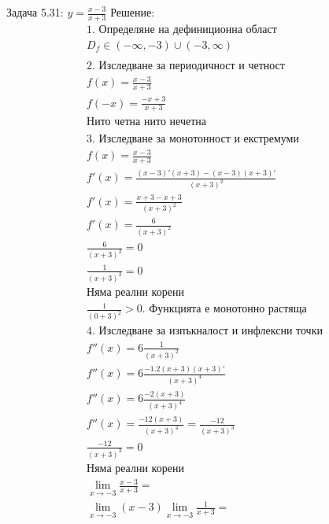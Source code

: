 \documentclass[a4paper, 20pt, fleqn, border=2pt]{article}
\begin{document}
\begin{enumerate}

Задача 5.31: $y = \frac{x - 3}{x + 3}$
Решение:
\begin{equation}
\begin{split}
    \text{1. Определяне на дефиниционна област} \\
    D_f \in (-\infty, -3) \cup (-3, \infty) \\
    \\
    \text{2. Изследване за периодичност и четност} \\
    f(x) = \frac{x - 3}{x + 3} \\
    f(-x) = \frac{-x + 3}{x + 3} \\
    \text{Нито четна нито нечетна} \\
    \\
    \text{3. Изследване за монотонност и екстремуми} \\
    f(x) = \frac{x - 3}{x + 3} \\
    f'(x) = \frac{(x - 3)'(x + 3) - (x - 3)(x + 3)'}{(x + 3)^2} \\
    f'(x) = \frac{x + 3 - x + 3}{(x + 3)^2} \\
    f'(x) = \frac{6}{(x + 3)^2} \\
    \frac{6}{(x + 3)^2} = 0 \\
    \frac{1}{(x + 3)^2} = 0 \\
    \text{Няма реални корени} \\
    \frac{1}{(0 + 3)^2} > 0
    \text{. Функцията е монотонно растяща}
    \\
    \text{4. Изследване за изпъкналост и инфлексни точки} \\
    f''(x) = 6\frac{1}{(x + 3)^2} \\
    f''(x) = 6\frac{-1.2(x + 3)(x + 3)'}{(x + 3)^4} \\
    f''(x) = 6\frac{-2(x + 3)}{(x + 3)^4} \\
    f''(x) = \frac{-12(x + 3)}{(x + 3)^4} = \frac{-12}{(x + 3)^3} \\
    \frac{-12}{(x + 3)^3} = 0 \\
    \text{Няма реални корени} \\
    \lim_{x\to-3}\frac{x - 3}{x + 3} = \\
    \lim_{x\to-3}(x - 3)\lim_{x\to-3}\frac{1}{x + 3} = \\

\end{split}
\end{equation}
\end{enumerate}
\end{document}
